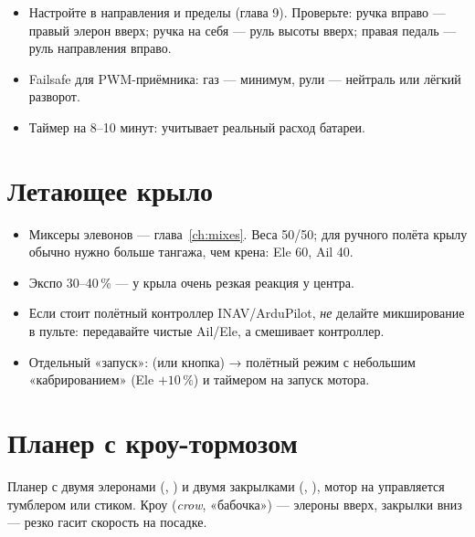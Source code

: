 \begin{itemize}
  \item Настройте в  направления и пределы (глава 9). Проверьте:
        ручка вправо --- правый элерон вверх; ручка на себя --- руль высоты вверх;
        правая педаль --- руль направления вправо.
  \item Failsafe для PWM-приёмника: газ --- минимум, рули --- нейтраль или лёгкий
        разворот.
  \item Таймер  на 8--10 минут: учитывает реальный расход батареи.
\end{itemize}

\section{Летающее крыло}

\begin{itemize}
  \item Миксеры элевонов --- глава~\ref{ch:mixes}. Веса 50/50; для ручного полёта крылу
        обычно нужно больше тангажа, чем крена: Ele 60, Ail 40.
  \item Экспо 30--40\,\% --- у крыла очень резкая реакция у центра.
  \item Если стоит полётный контроллер INAV/ArduPilot, \emph{не} делайте микширование в пульте:
        передавайте чистые Ail/Ele, а смешивает контроллер.
  \item Отдельный «запуск»:  (или кнопка) → полётный режим  с небольшим
        «кабрированием» (Ele $+10\,\%$) и таймером на запуск мотора.
\end{itemize}

\section{Планер с кроу-тормозом}

Планер с двумя элеронами (, ) и двумя закрылками (, ),
мотор на  управляется тумблером или стиком. Кроу (\emph{crow}, «бабочка») ---
элероны вверх, закрылки вниз --- резко гасит скорость на посадке.


